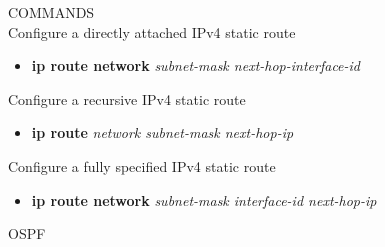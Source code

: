 \documentclass{article}
\begin{document}
COMMANDS\\
	Configure a directly attached IPv4 static route
		\begin{itemize}
			\item \textbf{ip route network} \textit{subnet-mask next-hop-interface-id} 
		\end{itemize}
	Configure a recursive IPv4 static route
		\begin{itemize}
			\item \textbf{ip route} \textit{network subnet-mask next-hop-ip} 
		\end{itemize}
	Configure a fully specified IPv4 static route
		\begin{itemize}
			\item \textbf{ip route network} \textit{subnet-mask interface-id next-hop-ip}
		\end{itemize}
OSPF
\end{document}
